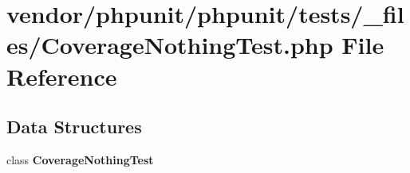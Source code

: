 \section{vendor/phpunit/phpunit/tests/\+\_\+files/\+Coverage\+Nothing\+Test.php File Reference}
\label{phpunit_2tests_2__files_2_coverage_nothing_test_8php}
\subsection*{Data Structures}
\begin{DoxyCompactItemize}
\item 
class {\bf Coverage\+Nothing\+Test}
\end{DoxyCompactItemize}
